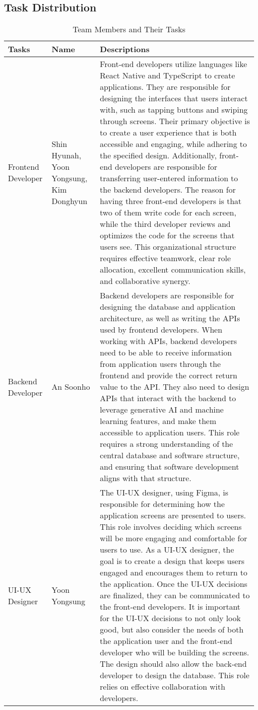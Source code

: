 \documentclass[conference, a4paper]{IEEEtran}
\begin{document}
\subsection{Task Distribution}


\begin{table}[h]
\caption{Team Members and Their Tasks}
\centering
\begin{tabular}{|p{1cm}|p{1.5cm}|p{5.2cm}|}
\hline Tasks & Name & Descriptions \\
\hline
Frontend Developer & Shin Hyunah, Yoon Yongsung, Kim Donghyun & Front-end developers utilize languages like React Native and TypeScript to create applications. They are responsible for designing the interfaces that users interact with, such as tapping buttons and swiping through screens. Their primary objective is to create a user experience that is both accessible and engaging, while adhering to the specified design. Additionally, front-end developers are responsible for transferring user-entered information to the backend developers. The reason for having three front-end developers is that two of them write code for each screen, while the third developer reviews and optimizes the code for the screens that users see. This organizational structure requires effective teamwork, clear role allocation, excellent communication skills, and collaborative synergy.\\

\hline
Backend Developer & An Soonho & Backend developers are responsible for designing the database and application architecture, as well as writing the APIs used by frontend developers. When working with APIs, backend developers need to be able to receive information from application users through the frontend and provide the correct return value to the API. They also need to design APIs that interact with the backend to leverage generative AI and machine learning features, and make them accessible to application users. This role requires a strong understanding of the central database and software structure, and ensuring that software development aligns with that structure.\\
\hline
UI-UX Designer & Yoon Yongsung & The UI-UX designer, using Figma, is responsible for determining how the application screens are presented to users. This role involves deciding which screens will be more engaging and comfortable for users to use. As a UI-UX designer, the goal is to create a design that keeps users engaged and encourages them to return to the application. Once the UI-UX decisions are finalized, they can be communicated to the front-end developers. It is important for the UI-UX decisions to not only look good, but also consider the needs of both the application user and the front-end developer who will be building the screens. The design should also allow the back-end developer to design the database. This role relies on effective collaboration with developers.\\
\hline
\end{tabular}
\end{table}
\end{document}
